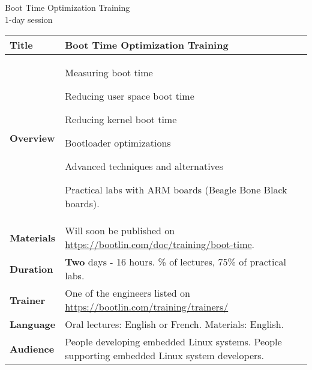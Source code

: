 \documentclass[a4paper,12pt,obeyspaces,spaces,hyphens]{article}
\begin{document}
\thispagestyle{fancy}

\setlength{\arrayrulewidth}{0.8pt}

\begin{center}
\LARGE
Boot Time Optimization Training\\
\large
1-day session
\end{center}
\vspace{1cm}

\small
{}

 {
  \begin{tabularx}{\textwidth}{|g|h|}
    {\bf Title} & {\bf Boot Time Optimization Training}\\
    \hline

    {\bf Overview} &
    Measuring boot time \par
    Reducing user space boot time \par
    Reducing kernel boot time \par
    Bootloader optimizations \par
    Advanced techniques and alternatives \par
    Practical labs with ARM boards (Beagle Bone Black
    boards).\\
    \hline
    {\bf Materials} &
    Will soon be published on
    \newline \url{https://bootlin.com/doc/training/boot-time}. \\
    \hline

    {\bf Duration} & {\bf Two} days - 16 hours.
    \% of lectures, 75\% of practical labs. \\
    \hline

    {\bf Trainer} & One of the engineers listed on
    \newline \url{https://bootlin.com/training/trainers/}\\
    \hline

    {\bf Language} & Oral lectures: English or French.
    \newline Materials: English.\\
    \hline

    {\bf Audience} & People developing embedded Linux systems.
    \newline People supporting embedded Linux system developers. \\
    \hline


\end{tabularx}}
\end{document}
